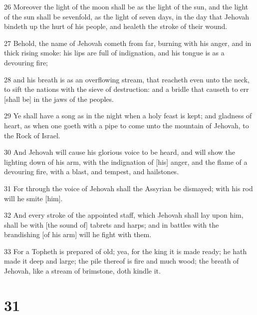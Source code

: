 \par 26 Moreover the light of the moon shall be as the light of the sun, and the light of the sun shall be sevenfold, as the light of seven days, in the day that Jehovah bindeth up the hurt of his people, and healeth the stroke of their wound.
\par 27 Behold, the name of Jehovah cometh from far, burning with his anger, and in thick rising smoke: his lips are full of indignation, and his tongue is as a devouring fire;
\par 28 and his breath is as an overflowing stream, that reacheth even unto the neck, to sift the nations with the sieve of destruction: and a bridle that causeth to err [shall be] in the jaws of the peoples.
\par 29 Ye shall have a song as in the night when a holy feast is kept; and gladness of heart, as when one goeth with a pipe to come unto the mountain of Jehovah, to the Rock of Israel.
\par 30 And Jehovah will cause his glorious voice to be heard, and will show the lighting down of his arm, with the indignation of [his] anger, and the flame of a devouring fire, with a blast, and tempest, and hailstones.
\par 31 For through the voice of Jehovah shall the Assyrian be dismayed; with his rod will he smite [him].
\par 32 And every stroke of the appointed staff, which Jehovah shall lay upon him, shall be with [the sound of] tabrets and harps; and in battles with the brandishing [of his arm] will he fight with them.
\par 33 For a Topheth is prepared of old; yea, for the king it is made ready; he hath made it deep and large; the pile thereof is fire and much wood; the breath of Jehovah, like a stream of brimstone, doth kindle it.

\chapter{31}

